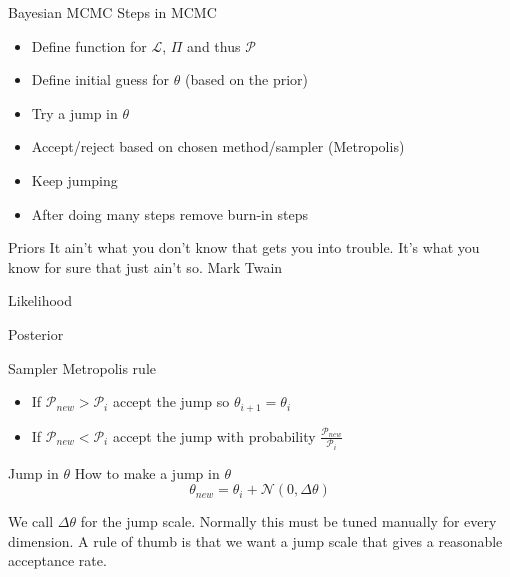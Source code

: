 \documentclass[12pt, aspectratio=149]{beamer}
\theoremstyle{plain}
\begin{document}
\begin{frame}{Bayesian MCMC}
Steps in MCMC
\begin{itemize}
\item Define function for $\mathcal{L}$, $\Pi$ and thus $\mathcal{P}$
\item Define initial guess for $\theta$ (based on the prior)
\item Try a jump in $\theta$
\item Accept/reject based on chosen method/sampler (Metropolis)
\item Keep jumping
\item After doing many steps remove burn-in steps
\end{itemize}
\end{frame}

\begin{frame}{Priors}
It ain’t what you don’t know that gets you into trouble. It’s what you know for sure that just ain’t so. Mark Twain
\end{frame}

\begin{frame}{Likelihood}

\end{frame}

\begin{frame}{Posterior}

\end{frame}

\begin{frame}{Sampler}
Metropolis rule
\begin{itemize}
\item If $\mathcal{P}_{new}>\mathcal{P}_{i}$ accept the jump so $\theta_{i+1}=\theta_i$
\item If $\mathcal{P}_{new}<\mathcal{P}_{i}$ accept the jump with probability $\frac{\mathcal{P}_{new}}{\mathcal{P}_i}$
\end{itemize}
\end{frame}

\begin{frame}{Jump in $\theta$}
How to make a jump in $\theta$
\begin{equation}
\theta_{new} = \theta_i + \mathcal{N}(0, \Delta\theta)
\end{equation}

We call $\Delta\theta$ for the jump scale. Normally this must be tuned manually for every dimension. A rule of thumb is that we want a jump scale that gives a reasonable acceptance rate.  
\end{frame}
\end{document}
